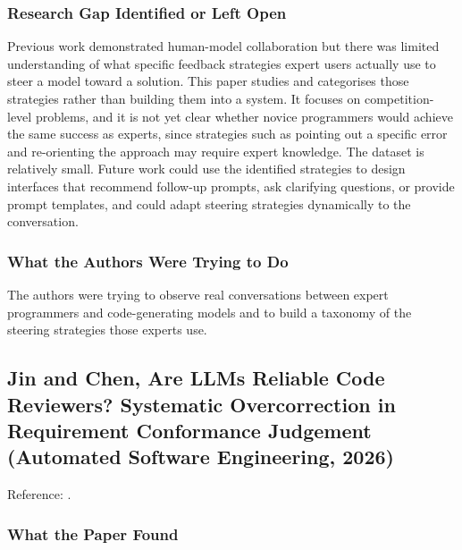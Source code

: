 \documentclass[11pt,a4paper]{report}
\begin{document}
\subsubsection{Research Gap Identified or Left Open}

Previous work demonstrated human-model collaboration but there was
limited understanding of what specific feedback strategies expert users
actually use to steer a model toward a solution. This paper studies and
categorises those strategies rather than building them into a system.
It focuses on competition-level problems, and it is not yet clear
whether novice programmers would achieve the same success as experts,
since strategies such as pointing out a specific error and re-orienting
the approach may require expert knowledge. The dataset is relatively
small. Future work could use the identified strategies to design
interfaces that recommend follow-up prompts, ask clarifying questions,
or provide prompt templates, and could adapt steering strategies
dynamically to the conversation.

\subsubsection{What the Authors Were Trying to Do}

The authors were trying to observe real conversations between expert
programmers and code-generating models and to build a taxonomy of the
steering strategies those experts use.

\subsection{Jin and Chen, Are LLMs Reliable Code Reviewers? Systematic
Overcorrection in Requirement Conformance Judgement (Automated Software
Engineering, 2026)}

\noindent Reference: \autocite{jin2026reliable}.

\subsubsection{What the Paper Found}
\end{document}
